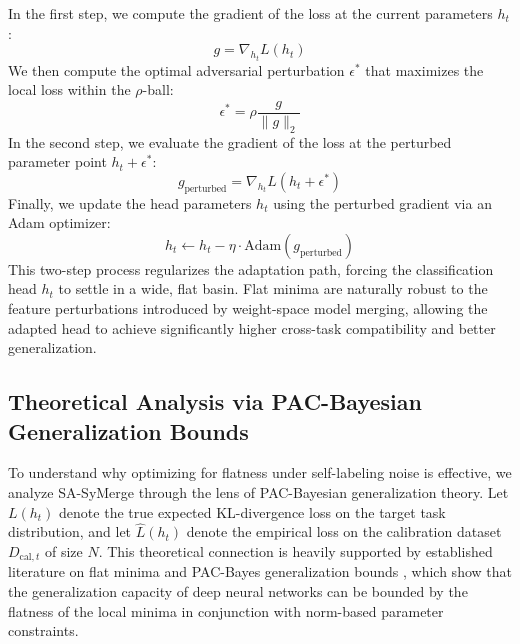 \documentclass{article}
\theoremstyle{plain}
\theoremstyle{definition}
\theoremstyle{remark}
\begin{document}
In the first step, we compute the gradient of the loss at the current parameters $h_t$:
\begin{equation}
    g = \nabla_{h_t} L(h_t)
\end{equation}
We then compute the optimal adversarial perturbation $\epsilon^*$ that maximizes the local loss within the $\rho$-ball:
\begin{equation}
    \epsilon^* = \rho \frac{g}{\|g\|_2}
\end{equation}
In the second step, we evaluate the gradient of the loss at the perturbed parameter point $h_t + \epsilon^*$:
\begin{equation}
    g_{\text{perturbed}} = \nabla_{h_t} L(h_t + \epsilon^*)
\end{equation}
Finally, we update the head parameters $h_t$ using the perturbed gradient via an Adam optimizer:
\begin{equation}
    h_t \leftarrow h_t - \eta \cdot \text{Adam}(g_{\text{perturbed}})
\end{equation}
This two-step process regularizes the adaptation path, forcing the classification head $h_t$ to settle in a wide, flat basin. Flat minima are naturally robust to the feature perturbations introduced by weight-space model merging, allowing the adapted head to achieve significantly higher cross-task compatibility and better generalization.

\subsection{Theoretical Analysis via PAC-Bayesian Generalization Bounds}
To understand why optimizing for flatness under self-labeling noise is effective, we analyze SA-SyMerge through the lens of PAC-Bayesian generalization theory. Let $L(h_t)$ denote the true expected KL-divergence loss on the target task distribution, and let $\hat{L}(h_t)$ denote the empirical loss on the calibration dataset $D_{\text{cal}, t}$ of size $N$. This theoretical connection is heavily supported by established literature on flat minima and PAC-Bayes generalization bounds \cite{mcallester1999pac, neyshabur2017exploring, bartlett2017spectrally, jiang2019fantastic, dziugaite2017computing}, which show that the generalization capacity of deep neural networks can be bounded by the flatness of the local minima in conjunction with norm-based parameter constraints.
\end{document}
